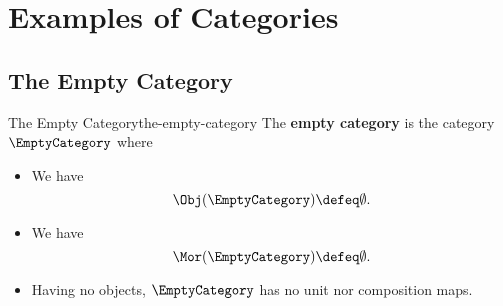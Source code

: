 \section{Examples of Categories}\label{section-examples-of-categories}
\subsection{The Empty Category}\label{subsection-the-empty-category}
\begin{example}{The Empty Category}{the-empty-category}%
    The \textbf{empty category} is the category $\EmptyCategory$ where%
    \begin{itemize}
        \item{}We have
            \[
                \Obj(\EmptyCategory)
                \defeq
                \emptyset.
            \]%
        \item{}We have
            \[
                \Mor(\EmptyCategory)
                \defeq
                \emptyset.
            \]%
        \item{}Having no objects, $\EmptyCategory$ has no unit nor composition maps.
    \end{itemize}
\end{example}
